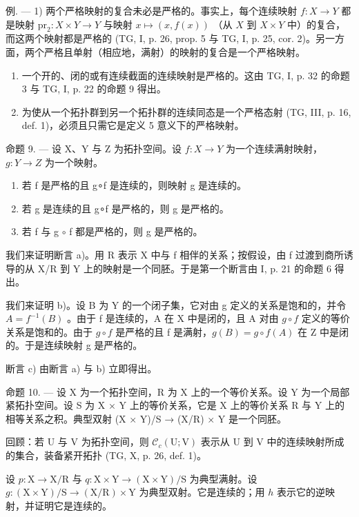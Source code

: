 例. --- 1) 两个严格映射的复合未必是严格的。事实上，每个连续映射 \(f \colon X \to Y\) 都是映射 \(\mathrm{pr}_2 \colon X \times Y \to Y\) 与映射 \(x \mapsto (x, f(x))\) （从 \(X\) 到 \(X \times Y\) 中）的复合，而这两个映射都是严格的 (TG, I, p. 26, prop. 5 与 TG, I, p. 25, cor. 2)。另一方面，两个严格且单射（相应地，满射）的映射的复合是一个严格映射。

\begin{enumerate}
\def\labelenumi{\arabic{enumi})}
\setcounter{enumi}{1}
\item
  一个开的、闭的或有连续截面的连续映射是严格的。这由 TG, I, p. 32 的命题 3 与 TG, I, p. 22 的命题 9 得出。
\item
为使从一个拓扑群到另一个拓扑群的连续同态是一个严格态射 (TG, III, p. 16, def. 1)，必须且只需它是定义 5 意义下的严格映射。
\end{enumerate}

命题 9. --- 设 X、Y 与 Z 为拓扑空间。设 \(f\colon X \to Y\) 为一个连续满射映射，\(g\colon Y \to Z\) 为一个映射。

\begin{enumerate}
\def\labelenumi{\alph{enumi})}
\item
若 f 是严格的且 g∘f 是连续的，则映射 g 是连续的。
\item
若 g 是连续的且 g∘f 是严格的，则 g 是严格的。
\item
若 f 与 g \(\circ\) f 都是严格的，则 g 是严格的。
\end{enumerate}

我们来证明断言 a)。用 R 表示 X 中与 f 相伴的关系；按假设，由 f 过渡到商所诱导的从 X/R 到 Y 上的映射是一个同胚。于是第一个断言由 I, p. 21 的命题 6 得出。

我们来证明 b)。设 B 为 Y 的一个闭子集，它对由 g 定义的关系是饱和的，并令 \(A = f^{-1}(B)\) 。由于 f 是连续的，A 在 X 中是闭的，且 A 对由 \(g \circ f\) 定义的等价关系是饱和的。由于 \(g \circ f\) 是严格的且 f 是满射，\(g(B) = g \circ f(A)\) 在 Z 中是闭的。于是连续映射 g 是严格的。

断言 c) 由断言 a) 与 b) 立即得出。

命题 10. --- 设 X 为一个拓扑空间，R 为 X 上的一个等价关系。设 Y 为一个局部紧拓扑空间。设 S 为 X × Y 上的等价关系，它是 X 上的等价关系 R 与 Y 上的相等关系之积。典型双射 (X × Y)/S → (X/R) × Y 是一个同胚。

回顾：若 U 与 V 为拓扑空间，则 \(\mathcal{C}_{c}(\mathrm{U};\mathrm{V})\) 表示从 U 到 V 中的连续映射所成的集合，装备紧开拓扑 (TG, X, p. 26, def. 1)。

设 \(p \colon \mathrm{X} \to \mathrm{X} / \mathrm{R}\) 与 \(q \colon \mathrm{X} \times \mathrm{Y} \to (\mathrm{X} \times \mathrm{Y}) / \mathrm{S}\) 为典型满射。设 \(g \colon (\mathrm{X} \times \mathrm{Y}) / \mathrm{S} \to (\mathrm{X} / \mathrm{R}) \times \mathrm{Y}\) 为典型双射。它是连续的；用 \(h\) 表示它的逆映射，并证明它是连续的。

